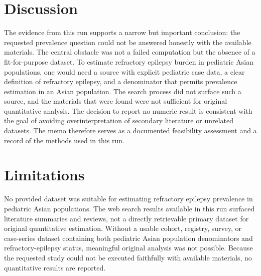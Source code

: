 \documentclass[11pt]{article}
\begin{document}
\section{Discussion}
The evidence from this run supports a narrow but important conclusion: the requested prevalence question could not be answered honestly with the available materials. The central obstacle was not a failed computation but the absence of a fit-for-purpose dataset. To estimate refractory epilepsy burden in pediatric Asian populations, one would need a source with explicit pediatric case data, a clear definition of refractory epilepsy, and a denominator that permits prevalence estimation in an Asian population. The search process did not surface such a source, and the materials that were found were not sufficient for original quantitative analysis. The decision to report no numeric result is consistent with the goal of avoiding overinterpretation of secondary literature or unrelated datasets. The memo therefore serves as a documented feasibility assessment and a record of the methods used in this run.

\section{Limitations}
No provided dataset was suitable for estimating refractory epilepsy prevalence in pediatric Asian populations. The web search results available in this run surfaced literature summaries and reviews, not a directly retrievable primary dataset for original quantitative estimation. Without a usable cohort, registry, survey, or case-series dataset containing both pediatric Asian population denominators and refractory-epilepsy status, meaningful original analysis was not possible. Because the requested study could not be executed faithfully with available materials, no quantitative results are reported.



\end{document}
